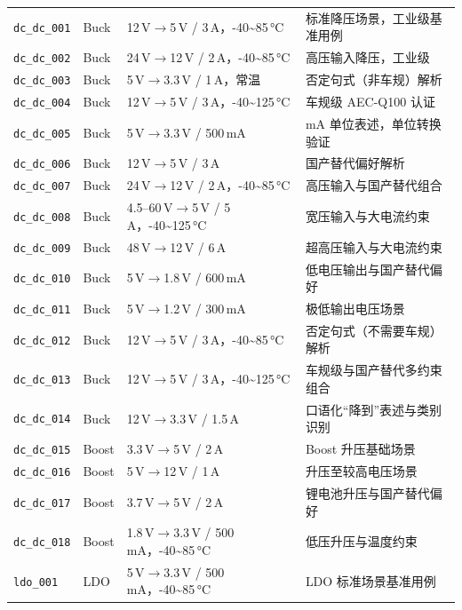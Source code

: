 \begin{longtable}{p{2.1cm}p{1.3cm}p{5.0cm}p{5.4cm}}
\texttt{dc\_dc\_001} & Buck & 12\,V$\rightarrow$5\,V / 3\,A，-40\textasciitilde{}85\,°C & 标准降压场景，工业级基准用例 \\
\texttt{dc\_dc\_002} & Buck & 24\,V$\rightarrow$12\,V / 2\,A，-40\textasciitilde{}85\,°C & 高压输入降压，工业级 \\
\texttt{dc\_dc\_003} & Buck & 5\,V$\rightarrow$3.3\,V / 1\,A，常温 & 否定句式（非车规）解析 \\
\texttt{dc\_dc\_004} & Buck & 12\,V$\rightarrow$5\,V / 3\,A，-40\textasciitilde{}125\,°C & 车规级 AEC-Q100 认证 \\
\texttt{dc\_dc\_005} & Buck & 5\,V$\rightarrow$3.3\,V / 500\,mA & mA 单位表述，单位转换验证 \\
\texttt{dc\_dc\_006} & Buck & 12\,V$\rightarrow$5\,V / 3\,A & 国产替代偏好解析 \\
\texttt{dc\_dc\_007} & Buck & 24\,V$\rightarrow$12\,V / 2\,A，-40\textasciitilde{}85\,°C & 高压输入与国产替代组合 \\
\texttt{dc\_dc\_008} & Buck & 4.5--60\,V$\rightarrow$5\,V / 5\,A，-40\textasciitilde{}125\,°C & 宽压输入与大电流约束 \\
\texttt{dc\_dc\_009} & Buck & 48\,V$\rightarrow$12\,V / 6\,A & 超高压输入与大电流约束 \\
\texttt{dc\_dc\_010} & Buck & 5\,V$\rightarrow$1.8\,V / 600\,mA & 低电压输出与国产替代偏好 \\
\texttt{dc\_dc\_011} & Buck & 5\,V$\rightarrow$1.2\,V / 300\,mA & 极低输出电压场景 \\
\texttt{dc\_dc\_012} & Buck & 12\,V$\rightarrow$5\,V / 3\,A，-40\textasciitilde{}85\,°C & 否定句式（不需要车规）解析 \\
\texttt{dc\_dc\_013} & Buck & 12\,V$\rightarrow$5\,V / 3\,A，-40\textasciitilde{}125\,°C & 车规级与国产替代多约束组合 \\
\texttt{dc\_dc\_014} & Buck & 12\,V$\rightarrow$3.3\,V / 1.5\,A & 口语化“降到”表述与类别识别 \\
\texttt{dc\_dc\_015} & Boost & 3.3\,V$\rightarrow$5\,V / 2\,A & Boost 升压基础场景 \\
\texttt{dc\_dc\_016} & Boost & 5\,V$\rightarrow$12\,V / 1\,A & 升压至较高电压场景 \\
\texttt{dc\_dc\_017} & Boost & 3.7\,V$\rightarrow$5\,V / 2\,A & 锂电池升压与国产替代偏好 \\
\texttt{dc\_dc\_018} & Boost & 1.8\,V$\rightarrow$3.3\,V / 500\,mA，-40\textasciitilde{}85\,°C & 低压升压与温度约束 \\
\texttt{ldo\_001} & LDO & 5\,V$\rightarrow$3.3\,V / 500\,mA，-40\textasciitilde{}85\,°C & LDO 标准场景基准用例 \\

\end{longtable}
